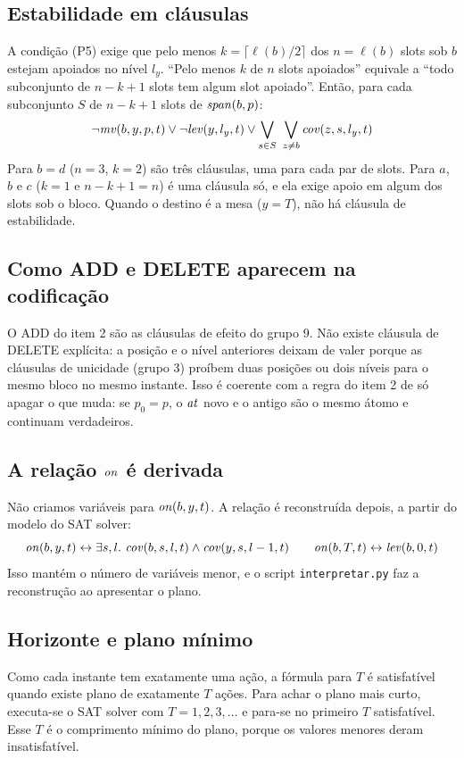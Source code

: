 \subsection{Estabilidade em cláusulas}

A condição (P5) exige que pelo menos $k=\lceil\ell(b)/2\rceil$ dos $n=\ell(b)$ slots sob $b$ estejam apoiados no nível $l_y$.
``Pelo menos $k$ de $n$ slots apoiados'' equivale a ``todo subconjunto de $n-k+1$ slots tem algum slot apoiado''. Então, para cada subconjunto $S$ de $n-k+1$ slots de $\mathit{span}(b,p)$:
\[
\neg\mathit{mv}(b,y,p,t)\lor\neg\mathit{lev}(y,l_y,t)\lor\bigvee_{s\in S}\ \bigvee_{z\neq b}\mathit{cov}(z,s,l_y,t)
\]
Para $b=d$ ($n=3$, $k=2$) são três cláusulas, uma para cada par de slots. Para $a$, $b$ e $c$ ($k=1$ e $n-k+1=n$) é uma cláusula só, e ela exige apoio em algum dos slots sob o bloco.
Quando o destino é a mesa ($y=T$), não há cláusula de estabilidade.

\subsection{Como ADD e DELETE aparecem na codificação}

O ADD do item 2 são as cláusulas de efeito do grupo 9. Não existe cláusula de DELETE explícita: a posição e o nível anteriores deixam de valer porque as cláusulas de unicidade (grupo 3) proíbem duas posições ou dois níveis para o mesmo bloco no mesmo instante.
Isso é coerente com a regra do item 2 de só apagar o que muda: se $p_0=p$, o $\mathit{at}$ novo e o antigo são o mesmo átomo e continuam verdadeiros.

\subsection{A relação $\mathit{on}$ é derivada}\label{sec:on}

Não criamos variáveis para $\mathit{on}(b,y,t)$. A relação é reconstruída depois, a partir do modelo do SAT solver:
\[
\On(b,y,t)\leftrightarrow\exists s,l.\ \Cov(b,s,l,t)\land\Cov(y,s,l-1,t)\qquad
\On(b,T,t)\leftrightarrow\Lev(b,0,t)
\]
Isso mantém o número de variáveis menor, e o script \texttt{interpretar.py} faz a reconstrução ao apresentar o plano.

\subsection{Horizonte e plano mínimo}

Como cada instante tem exatamente uma ação, a fórmula para $T$ é satisfatível quando existe plano de exatamente $T$ ações.
Para achar o plano mais curto, executa-se o SAT solver com $T=1,2,3,\dots$ e para-se no primeiro $T$ satisfatível. Esse $T$ é o comprimento mínimo do plano, porque os valores menores deram insatisfatível.
